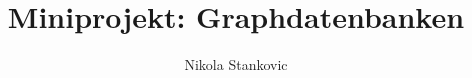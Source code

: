 \documentclass[a4paper,ngerman,12pt]{scrartcl}
\newcommand{\meinname}{Nikola Stankovic}
\newcommand{\dokumenttitel}{Miniprojekt: Graphdatenbanken}
\begin{document}
\author{\meinname}

\title{\dokumenttitel}
\maketitle
\tableofcontents
\end{document}
